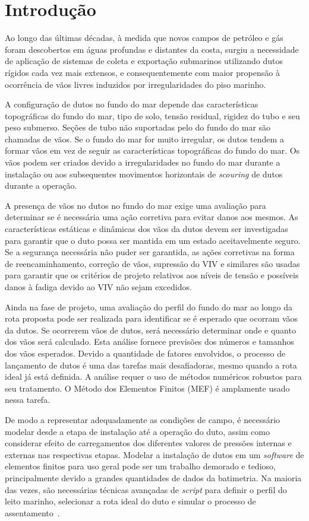 \chapter{Introdução}


Ao longo das últimas décadas, à medida que novos campos de petróleo e gás foram descobertos em águas profundas e distantes da costa, surgiu a necessidade de aplicação de sistemas de coleta e exportação submarinos utilizando dutos rígidos cada vez mais extensos, e consequentemente com maior propensão à ocorrência de vãos livres induzidos por irregularidades do piso marinho.

A configuração de dutos no fundo do mar depende das características topográficas do fundo do mar, tipo de solo, tensão residual, rigidez do tubo e seu peso submerso. Seções de tubo não suportadas pelo do fundo do mar são chamadas de vãos. Se o fundo do mar for muito irregular, os dutos tendem a formar vãos em vez de seguir as características topográficas do fundo do mar. Os vãos podem ser criados devido a irregularidades no fundo do mar durante a instalação ou aos subsequentes movimentos horizontais de \textit{scouring} de dutos durante a operação.

A presença de vãos no dutos no fundo do mar exige uma avaliação para determinar se é necessária uma ação corretiva para evitar danos aos mesmos. As características estáticas e dinâmicas dos vãos da dutos devem ser investigadas para garantir que o duto possa ser mantida em um estado aceitavelmente seguro. Se a segurança necessária não puder ser garantida, as ações corretivas na forma de reencaminhamento, correção de vãos, supressão do VIV e similares são usadas para garantir que os critérios de projeto relativos aos níveis de tensão e possíveis danos à fadiga devido ao VIV não sejam excedidos.

Ainda na fase de projeto, uma avaliação do perfil do fundo do mar ao longo da rota proposta pode ser realizada para identificar se é esperado que ocorram vãos da dutos. Se ocorrerem vãos de dutos, será necessário determinar onde e quanto dos vãos será calculado. Esta análise fornece previsões dos números e tamanhos dos vãos esperados.
Devido a quantidade de fatores envolvidos, o processo de lançamento de dutos é uma das tarefas mais desafiadoras, mesmo quando a rota ideal já está definida. A análise requer o uso de métodos numéricos robustos para seu tratamento.
O Método dos Elementos Finitos (MEF) é amplamente usado nessa tarefa.

De modo a representar adequadamente as condições de campo, é necessário modelar desde a etapa de instalação até a operação do duto, assim como considerar efeito de carregamentos dos diferentes valores de pressões internas e externas nas respectivas etapas.
Modelar a instalação de dutos em um \textit{software} de elementos finitos para uso geral pode ser um trabalho demorado e tedioso, principalmente devido a grandes quantidades de dados da batimetria.
Na maioria das vezes, são necessárias técnicas avançadas de \textit{script} para definir o perfil do leito marinho, selecionar a rota ideal do duto e simular o processo de assentamento~\cite{VandenAbeele2013}.

